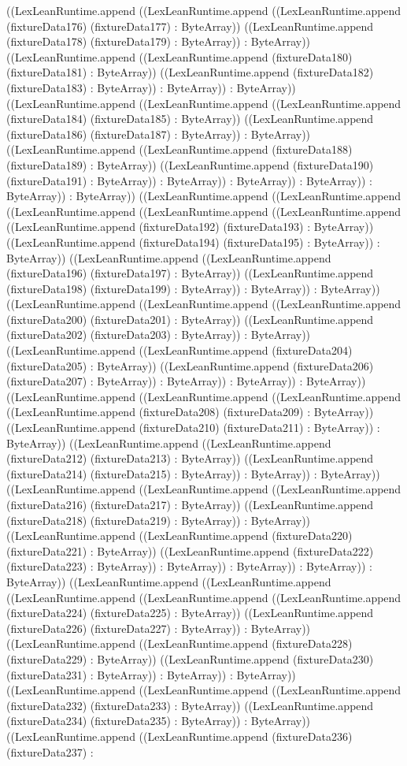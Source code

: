 \documentclass[11pt]{article}
\begin{document}
((LexLeanRuntime.append ((LexLeanRuntime.append ((LexLeanRuntime.append (fixtureData176) (fixtureData177) : ByteArray)) ((LexLeanRuntime.append (fixtureData178) (fixtureData179) : ByteArray)) : ByteArray)) ((LexLeanRuntime.append ((LexLeanRuntime.append (fixtureData180) (fixtureData181) : ByteArray)) ((LexLeanRuntime.append (fixtureData182) (fixtureData183) : ByteArray)) : ByteArray)) : ByteArray)) ((LexLeanRuntime.append ((LexLeanRuntime.append ((LexLeanRuntime.append (fixtureData184) (fixtureData185) : ByteArray)) ((LexLeanRuntime.append (fixtureData186) (fixtureData187) : ByteArray)) : ByteArray)) ((LexLeanRuntime.append ((LexLeanRuntime.append (fixtureData188) (fixtureData189) : ByteArray)) ((LexLeanRuntime.append (fixtureData190) (fixtureData191) : ByteArray)) : ByteArray)) : ByteArray)) : ByteArray)) : ByteArray)) : ByteArray)) ((LexLeanRuntime.append ((LexLeanRuntime.append ((LexLeanRuntime.append ((LexLeanRuntime.append ((LexLeanRuntime.append ((LexLeanRuntime.append (fixtureData192) (fixtureData193) : ByteArray)) ((LexLeanRuntime.append (fixtureData194) (fixtureData195) : ByteArray)) : ByteArray)) ((LexLeanRuntime.append ((LexLeanRuntime.append (fixtureData196) (fixtureData197) : ByteArray)) ((LexLeanRuntime.append (fixtureData198) (fixtureData199) : ByteArray)) : ByteArray)) : ByteArray)) ((LexLeanRuntime.append ((LexLeanRuntime.append ((LexLeanRuntime.append (fixtureData200) (fixtureData201) : ByteArray)) ((LexLeanRuntime.append (fixtureData202) (fixtureData203) : ByteArray)) : ByteArray)) ((LexLeanRuntime.append ((LexLeanRuntime.append (fixtureData204) (fixtureData205) : ByteArray)) ((LexLeanRuntime.append (fixtureData206) (fixtureData207) : ByteArray)) : ByteArray)) : ByteArray)) : ByteArray)) ((LexLeanRuntime.append ((LexLeanRuntime.append ((LexLeanRuntime.append ((LexLeanRuntime.append (fixtureData208) (fixtureData209) : ByteArray)) ((LexLeanRuntime.append (fixtureData210) (fixtureData211) : ByteArray)) : ByteArray)) ((LexLeanRuntime.append ((LexLeanRuntime.append (fixtureData212) (fixtureData213) : ByteArray)) ((LexLeanRuntime.append (fixtureData214) (fixtureData215) : ByteArray)) : ByteArray)) : ByteArray)) ((LexLeanRuntime.append ((LexLeanRuntime.append ((LexLeanRuntime.append (fixtureData216) (fixtureData217) : ByteArray)) ((LexLeanRuntime.append (fixtureData218) (fixtureData219) : ByteArray)) : ByteArray)) ((LexLeanRuntime.append ((LexLeanRuntime.append (fixtureData220) (fixtureData221) : ByteArray)) ((LexLeanRuntime.append (fixtureData222) (fixtureData223) : ByteArray)) : ByteArray)) : ByteArray)) : ByteArray)) : ByteArray)) ((LexLeanRuntime.append ((LexLeanRuntime.append ((LexLeanRuntime.append ((LexLeanRuntime.append ((LexLeanRuntime.append (fixtureData224) (fixtureData225) : ByteArray)) ((LexLeanRuntime.append (fixtureData226) (fixtureData227) : ByteArray)) : ByteArray)) ((LexLeanRuntime.append ((LexLeanRuntime.append (fixtureData228) (fixtureData229) : ByteArray)) ((LexLeanRuntime.append (fixtureData230) (fixtureData231) : ByteArray)) : ByteArray)) : ByteArray)) ((LexLeanRuntime.append ((LexLeanRuntime.append ((LexLeanRuntime.append (fixtureData232) (fixtureData233) : ByteArray)) ((LexLeanRuntime.append (fixtureData234) (fixtureData235) : ByteArray)) : ByteArray)) ((LexLeanRuntime.append ((LexLeanRuntime.append (fixtureData236) (fixtureData237) : 
\end{document}

